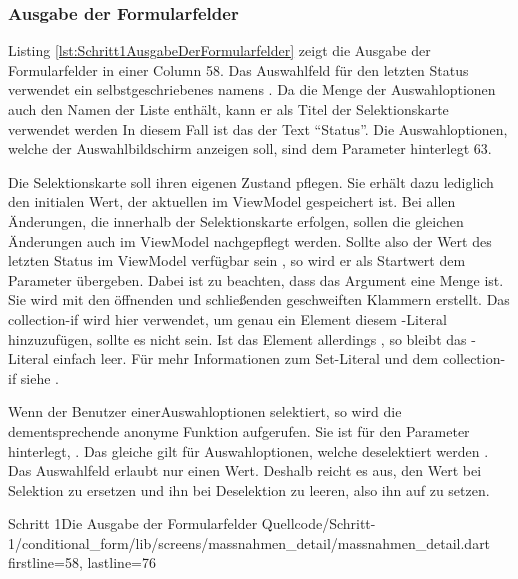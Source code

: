 \clearpage

\subsubsection{Ausgabe der Formularfelder}

Listing \ref{lst:Schritt1AusgabeDerFormularfelder} zeigt die Ausgabe der Formularfelder in einer Column 58. Das Auswahlfeld für den letzten Status verwendet ein selbstgeschriebenes  namens  . Da die Menge der Auswahloptionen auch den Namen der Liste enthält, kann er als Titel der Selektionskarte verwendet werden  In diesem Fall ist das der Text \enquote{Status}. Die Auswahloptionen, welche  der Auswahlbildschirm anzeigen soll, sind dem Parameter  hinterlegt 63.

Die Selektionskarte soll ihren eigenen Zustand pflegen. Sie erhält dazu lediglich den initialen Wert, der aktuellen im ViewModel gespeichert ist. Bei allen Änderungen, die innerhalb der Selektionskarte erfolgen, sollen die gleichen Änderungen auch im ViewModel nachgepflegt werden. Sollte also der Wert des letzten Status im ViewModel verfügbar sein , so wird er als Startwert dem Parameter   übergeben. Dabei ist zu beachten, dass das Argument eine Menge ist. Sie wird mit den  öffnenden und schließenden geschweiften Klammern erstellt. Das collection-if wird hier verwendet, um genau ein Element diesem -Literal hinzuzufügen, sollte es nicht  sein. Ist das Element allerdings , so bleibt das -Literal einfach leer. Für mehr Informationen zum Set-Literal und dem collection-if siehe .


Wenn der Benutzer einerAuswahloptionen selektiert, so  wird die dementsprechende anonyme Funktion aufgerufen. Sie ist für den Parameter  hinterlegt, . Das gleiche gilt für Auswahloptionen, welche deselektiert werden . Das Auswahlfeld erlaubt nur einen Wert. Deshalb reicht es aus, den Wert bei Selektion zu ersetzen und ihn bei Deselektion zu leeren, also ihn auf  zu setzen. 

\begin{alexlisting}{Schritt 1}{Die Ausgabe der Formularfelder}
  {Quellcode/Schritt-1/conditional_form/lib/screens/massnahmen_detail/massnahmen_detail.dart}
  {firstline=58, lastline=76}
  \label{lst:Schritt1AusgabeDerFormularfelder}
\end{alexlisting}


